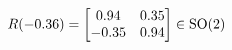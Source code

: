 \documentclass[preview]{standalone}
\begin{document}
\begin{align*}
\special{dvisvgm:raw <g id='unique000'>}R(-0.36) = \begin{bmatrix} 0.94 & 0.35 \\ -0.35 & 0.94 \end{bmatrix} \in \text{SO}(2)\special{dvisvgm:raw </g>}
\end{align*}
\end{document}
